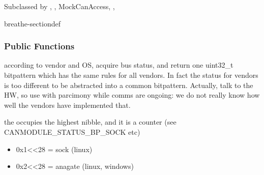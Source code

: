 \documentclass[a4paper,10pt,english]{sphinxmanual}
\begin{document}
\begin{fulllineitems}
%
\pysigstartmultiline
{}%
\pysigstopmultiline
\sphinxAtStartPar
Subclassed by {\hyperref[\detokenize{classestracing:classAnaCanScan}]{}}, {\hyperref[\detokenize{vendors/systec:classCSockCanScan}]{}}, MockCanAccess, {\hyperref[\detokenize{vendors/peak:classPKCanScan}]{}}, {\hyperref[\detokenize{classestracing:classSTCanScan}]{}}

\begin{sphinxuseclass}{breathe-sectiondef}\subsubsection*{Public Functions}

\begin{fulllineitems}
\label{\detokenize{canports:_CPPv4N9CanModule10CCanAccess13getPortStatusEv}}%
\pysigstartmultiline
{}%
\pysigstopmultiline
\sphinxAtStartPar
according to vendor and OS, acquire bus status, and return one uint32\_t bitpattern which has the same rules for all vendors. In fact the status for vendors is too different to be abstracted into a common bitpattern. Actually, talk to the HW, so use with parcimony while comms are ongoing: we do not really know how well the vendors have implemented that.

\sphinxAtStartPar
the  occupies the highest nibble, and it is a counter (see CANMODULE\_STATUS\_BP\_SOCK etc)\begin{itemize}
\item {} 
\sphinxAtStartPar
0x1\textless{}\textless{}28 = sock (linux)

\item {} 
\sphinxAtStartPar
0x2\textless{}\textless{}28 = anagate (linux, windows)


\end{itemize}
\end{fulllineitems}
\end{sphinxuseclass}
\end{fulllineitems}
\end{document}
